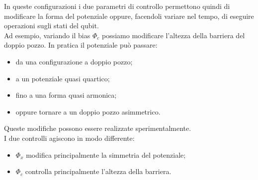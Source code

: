 In queste configurazioni i due parametri di controllo permettono quindi di modificare la forma del potenziale oppure, facendoli variare nel tempo, di eseguire operazioni sugli stati del qubit.\\
Ad esempio, variando il bias $\Phi_c$ possiamo modificare l'altezza della barriera del doppio pozzo. In pratica il potenziale può passare:
\begin{itemize}[leftmargin=0.5cm]
    \item da una configurazione a doppio pozzo;
    \item a un potenziale quasi quartico;
    \item fino a una forma quasi armonica;
    \item oppure tornare a un doppio pozzo asimmetrico.
\end{itemize}
Queste modifiche possono essere realizzate sperimentalmente.\\
I due controlli agiscono in modo differente:
\begin{itemize}[leftmargin=0.5cm]
    \item $\Phi_x$ modifica principalmente la simmetria del potenziale;
    \item $\Phi_c$ controlla principalmente l'altezza della barriera.
\end{itemize}
